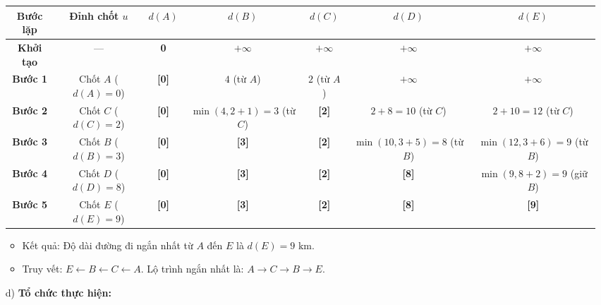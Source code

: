 \documentclass[12pt, a4paper]{article}
\begin{document}
\begin{itemize}[leftmargin=1.2cm]
    \begin{center}
    \begin{tabular}{|c|c|c|c|c|c|c|}
    \hline
    \textbf{Bước lặp} & \textbf{Đỉnh chốt $u$} & $d(A)$ & $d(B)$ & $d(C)$ & $d(D)$ & $d(E)$ \\ \hline
    \textbf{Khởi tạo} & --- & \textbf{0} & $+\infty$ & $+\infty$ & $+\infty$ & $+\infty$ \\ \hline
    \textbf{Bước 1} & Chốt $A$ ($d(A)=0$) & \textbf{[0]} & $4$ (từ $A$) & $2$ (từ $A$) & $+\infty$ & $+\infty$ \\ \hline
    \textbf{Bước 2} & Chốt $C$ ($d(C)=2$) & \textbf{[0]} & $\min(4, 2+1)=3$ (từ $C$) & \textbf{[2]} & $2+8=10$ (từ $C$) & $2+10=12$ (từ $C$) \\ \hline
    \textbf{Bước 3} & Chốt $B$ ($d(B)=3$) & \textbf{[0]} & \textbf{[3]} & \textbf{[2]} & $\min(10, 3+5)=8$ (từ $B$) & $\min(12, 3+6)=9$ (từ $B$) \\ \hline
    \textbf{Bước 4} & Chốt $D$ ($d(D)=8$) & \textbf{[0]} & \textbf{[3]} & \textbf{[2]} & \textbf{[8]} & $\min(9, 8+2)=9$ (giữ $B$) \\ \hline
    \textbf{Bước 5} & Chốt $E$ ($d(E)=9$) & \textbf{[0]} & \textbf{[3]} & \textbf{[2]} & \textbf{[8]} & \textbf{[9]} \\ \hline
    \end{tabular}
    \end{center}

    \begin{itemize}[leftmargin=0.6cm]
        \item Kết quả: Độ dài đường đi ngắn nhất từ $A$ đến $E$ là $d(E) = 9\text{ km}$.
        \item Truy vết: $E \leftarrow B \leftarrow C \leftarrow A$. Lộ trình ngắn nhất là: $A \to C \to B \to E$.
    \end{itemize}

    \item[d)] \textbf{Tổ chức thực hiện:}
\end{itemize}
\end{document}
